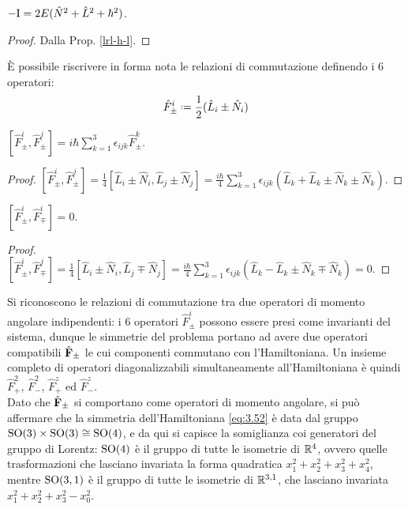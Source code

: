\begin{proposition}\label{mod-n-l}
	$ -\mathrm{I} = 2E (\hat{N}^2 + \hat{L}^2 + \hbar^2) $.
\end{proposition}
\begin{proof}
	Dalla Prop. \ref{lrl-h-l}.
\end{proof}

È possibile riscrivere in forma nota le relazioni di commutazione definendo i 6 operatori:
\begin{equation}
	\hat{F}_{\pm}^i \defeq \frac{1}{2} (\hat{L}_i \pm \hat{N}_i)
	\label{eq:3.57}
\end{equation}

\begin{proposition}
	$ [\hat{F}_{\pm}^i, \hat{F}_{\pm}^j] = i\hbar \sum_{k = 1}^{3} \epsilon_{ijk} \hat{F}_{\pm}^k $.
\end{proposition}
\begin{proof}
	$ [\hat{F}_{\pm}^i, \hat{F}_{\pm}^j] = \frac{1}{4} [\hat{L}_i \pm \hat{N}_i, \hat{L}_j \pm \hat{N}_j] = \frac{i\hbar}{4} \sum_{k = 1}^{3} \epsilon_{ijk} (\hat{L}_k + \hat{L}_k \pm \hat{N}_k \pm \hat{N}_k) $.
\end{proof}

\begin{proposition}
	$ [\hat{F}_{\pm}^i, \hat{F}_{\mp}^i] = 0 $.
\end{proposition}
\begin{proof}
	$ [\hat{F}_{\pm}^i, \hat{F}_{\mp}^j] = \frac{1}{4} [\hat{L}_i \pm \hat{N}_i, \hat{L}_j \mp \hat{N}_j] = \frac{i\hbar}{4} \sum_{k = 1}^{3} \epsilon_{ijk} (\hat{L}_k - \hat{L}_k \pm \hat{N}_k \mp \hat{N}_k) = 0 $.
\end{proof}

Si riconoscono le relazioni di commutazione tra due operatori di momento angolare indipendenti: i 6 operatori $ \hat{F}_{\pm}^i $ possono essere presi come invarianti del sistema, dunque le simmetrie del problema portano ad avere due operatori compatibili $ \hat{\mathbf{F}}_{\pm} $ le cui componenti commutano con l'Hamiltoniana. Un insieme completo di operatori diagonalizzabili simultaneamente all'Hamiltoniana è quindi $ \hat{F}_+^2 $, $ \hat{F}_-^2 $, $ \hat{F}_+^z $ ed $ \hat{F}_-^z $.\\
Dato che $ \hat{\mathbf{F}}_{\pm} $ si comportano come operatori di momento angolare, si può affermare che la simmetria dell'Hamiltoniana \ref{eq:3.52} è data dal gruppo $ \mathrm{SO}(3) \times \mathrm{SO}(3) \cong \mathrm{SO}(4) $, e da qui si capisce la somiglianza coi generatori del gruppo di Lorentz: $ \mathrm{SO}(4) $ è il gruppo di tutte le isometrie di $ \mathbb{R}^4 $, ovvero quelle trasformazioni che lasciano invariata la forma quadratica $ x_1^2 + x_2^2 + x_3^2 + x_4^2 $, mentre $ \mathrm{SO}(3,1) $ è il gruppo di tutte le isometrie di $ \mathbb{R}^{3,1} $, che lasciano invariata $ x_1^2 + x_2^2 + x_3^2 - x_0^2 $.

